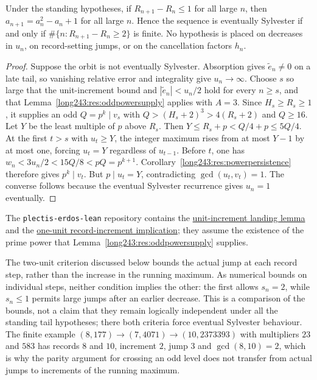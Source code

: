 \documentclass[11pt]{article}
\begin{document}
\begin{theorem}\label{long243:res:unitrecord}
Under the standing hypotheses, if $R_{n+1}-R_n\le1$ for all large $n$, then $a_{n+1}=a_n^2-a_n+1$
for all large $n$.  Hence the sequence is eventually Sylvester if and only if
$\#\{n:R_{n+1}-R_n\ge2\}$ is finite.  No hypothesis is placed on decreases in $u_n$, on
record-setting jumps, or on the cancellation factors $h_n$.
\end{theorem}

\begin{proof}
Suppose the orbit is not eventually Sylvester. Absorption gives
$\tilde e_n\ne0$ on a late tail, so vanishing relative error and integrality give
$u_n\to\infty$. Choose $s$ so large that the unit-increment bound and
$|\tilde e_n|<u_n/2$ hold for every $n\ge s$, and that
Lemma~\ref{long243:res:oddpowersupply} applies with $A=3$.
Since $H_s\ge R_s\ge1$, it supplies an odd $Q=p^k\mid v_s$ with
$Q>(H_s+2)^3>4(R_s+2)$ and $Q\ge16$.
Let $Y$ be the least multiple of $p$ above $R_s$. Then
$Y\le R_s+p< Q/4+p\le5Q/4$.
At the first $t>s$ with $u_t\ge Y$, the integer maximum rises from
at most $Y-1$ by at most one, forcing $u_t=Y$ regardless of
$u_{t-1}$. Before $t$, one has
$w_n<3u_n/2<15Q/8<pQ=p^{k+1}$.
Corollary~\ref{long243:res:powerpersistence} therefore gives $p^k\mid v_t$.
But $p\mid u_t=Y$, contradicting $\gcd(u_t,v_t)=1$.
The converse follows because the eventual Sylvester recurrence gives $u_n=1$ eventually.
\end{proof}

The \texttt{plectis-erdos-lean} repository contains the
\href{https://github.com/wcook04/plectis-erdos-lean/blob/52f29ad173b04e3bac941b3663f2b9aebe5de0bb/ErdosProblems/Erdos243/RecordIncrementBarrier.lean\#L329}{unit-increment landing lemma} and the
\href{https://github.com/wcook04/plectis-erdos-lean/blob/52f29ad173b04e3bac941b3663f2b9aebe5de0bb/ErdosProblems/Erdos243/RecordIncrementBarrier.lean\#L425}{one-unit record-increment implication};
they assume the existence of the prime power that
Lemma~\ref{long243:res:oddpowersupply} supplies.


The two-unit criterion discussed below bounds the actual jump at each
record step, rather than the increase in the running maximum. As numerical
bounds on individual steps, neither condition implies the other: the first
allows $s_n=2$, while $s_n\le1$ permits large jumps after an earlier
decrease. This is a comparison of the bounds, not a claim that they remain
logically independent under all the standing tail hypotheses; there both
criteria force eventual Sylvester behaviour.
The finite example
$(8,177)\to(7,4071)\to(10,2373393)$ with multipliers $23$ and $583$ has records
$8$ and $10$, increment $2$, jump $3$ and $\gcd(8,10)=2$, which is why the
parity argument for crossing an odd level does not transfer from actual
jumps to increments of the running maximum.
\end{document}
